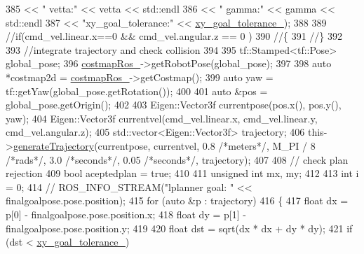 \begin{DoxyCode}
{385                                               << \textcolor{stringliteral}{" vetta:"} << vetta << std::endl
386                                               << \textcolor{stringliteral}{" gamma:"} << gamma << std::endl
387                                               << \textcolor{stringliteral}{"xy\_goal\_tolerance:"} << 
      \hyperlink{classmove__base__z__client_1_1forward__local__planner_1_1ForwardLocalPlanner_a462f6c9011e538965326add2dfb7529d}{xy\_goal\_tolerance\_});
388 
389     \textcolor{comment}{//if(cmd\_vel.linear.x==0 && cmd\_vel.angular.z == 0 )}
390     \textcolor{comment}{//\{}
391     \textcolor{comment}{//\}}
392 
393     \textcolor{comment}{//integrate trajectory and check collision}
394 
395     tf::Stamped<tf::Pose> global\_pose;
396     \hyperlink{classmove__base__z__client_1_1forward__local__planner_1_1ForwardLocalPlanner_a00139db9509e49ff456276a86785d234}{costmapRos\_}->getRobotPose(global\_pose);
397 
398     \textcolor{keyword}{auto} *costmap2d = \hyperlink{classmove__base__z__client_1_1forward__local__planner_1_1ForwardLocalPlanner_a00139db9509e49ff456276a86785d234}{costmapRos\_}->getCostmap();
399     \textcolor{keyword}{auto} yaw = tf::getYaw(global\_pose.getRotation());
400 
401     \textcolor{keyword}{auto} &pos = global\_pose.getOrigin();
402 
403     Eigen::Vector3f currentpose(pos.x(), pos.y(), yaw);
404     Eigen::Vector3f currentvel(cmd\_vel.linear.x, cmd\_vel.linear.y, cmd\_vel.angular.z);
405     std::vector<Eigen::Vector3f> trajectory;
406     this->\hyperlink{classmove__base__z__client_1_1forward__local__planner_1_1ForwardLocalPlanner_af0f99683368650fd03c04079afd8c806}{generateTrajectory}(currentpose, currentvel, 0.8 \textcolor{comment}{/*meters*/}, M\_PI / 8 \textcolor{comment}{/*rads*/}, 
      3.0 \textcolor{comment}{/*seconds*/}, 0.05 \textcolor{comment}{/*seconds*/}, trajectory);
407 
408     \textcolor{comment}{// check plan rejection}
409     \textcolor{keywordtype}{bool} aceptedplan = \textcolor{keyword}{true};
410 
411     \textcolor{keywordtype}{unsigned} \textcolor{keywordtype}{int} mx, my;
412 
413     \textcolor{keywordtype}{int} i = 0;
414     \textcolor{comment}{// ROS\_INFO\_STREAM("lplanner goal: " << finalgoalpose.pose.position);}
415     \textcolor{keywordflow}{for} (\textcolor{keyword}{auto} &p : trajectory)
416     \{
417         \textcolor{keywordtype}{float} dx = p[0] - finalgoalpose.pose.position.x;
418         \textcolor{keywordtype}{float} dy = p[1] - finalgoalpose.pose.position.y;
419 
420         \textcolor{keywordtype}{float} dst = sqrt(dx * dx + dy * dy);
421         \textcolor{keywordflow}{if} (dst < \hyperlink{classmove__base__z__client_1_1forward__local__planner_1_1ForwardLocalPlanner_a462f6c9011e538965326add2dfb7529d}{xy\_goal\_tolerance\_})
}
\end{DoxyCode}
